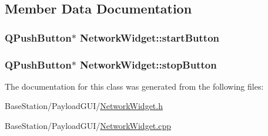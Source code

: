 \subsection{Member Data Documentation}
\hypertarget{classNetworkWidget_a310960ed56867e9dfe77f41652c70e86}{
\subsubsection[{start\-Button}]{\setlength{\rightskip}{0pt plus 5cm}Q\-Push\-Button$\ast$ Network\-Widget\-::start\-Button\hspace{0.3cm}{\ttfamily [private]}}}\label{classNetworkWidget_a310960ed56867e9dfe77f41652c70e86}
\hypertarget{classNetworkWidget_abd91e508b53a4a911eb482a5ea36fd51}{
\subsubsection[{stop\-Button}]{\setlength{\rightskip}{0pt plus 5cm}Q\-Push\-Button$\ast$ Network\-Widget\-::stop\-Button\hspace{0.3cm}{\ttfamily [private]}}}\label{classNetworkWidget_abd91e508b53a4a911eb482a5ea36fd51}


The documentation for this class was generated from the following files\-:\begin{DoxyCompactItemize}
\item 
Base\-Station/\-Payload\-G\-U\-I/\hyperlink{NetworkWidget_8h}{Network\-Widget.\-h}\item 
Base\-Station/\-Payload\-G\-U\-I/\hyperlink{NetworkWidget_8cpp}{Network\-Widget.\-cpp}\end{DoxyCompactItemize}
